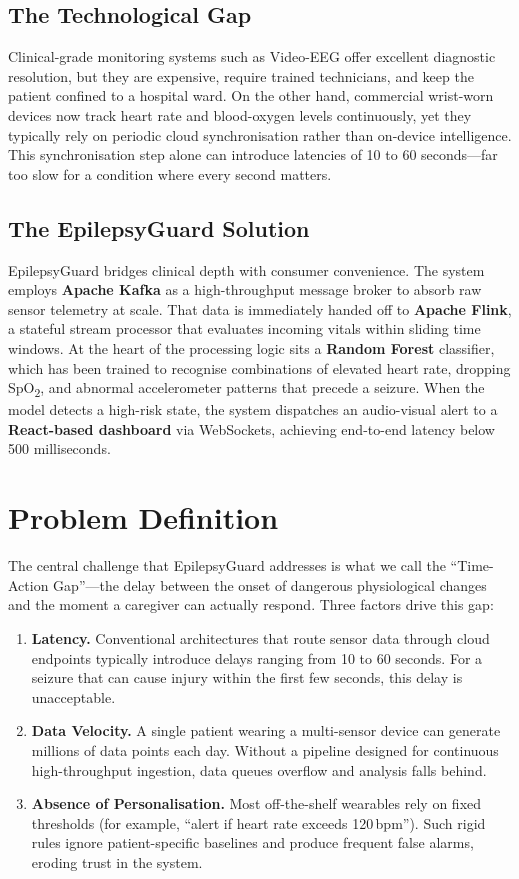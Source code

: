 \documentclass[12pt, a4paper, oneside]{report}
\begin{document}
\subsection{The Technological Gap}
Clinical-grade monitoring systems such as Video-EEG offer excellent diagnostic resolution, but they are expensive, require trained technicians, and keep the patient confined to a hospital ward. On the other hand, commercial wrist-worn devices now track heart rate and blood-oxygen levels continuously, yet they typically rely on periodic cloud synchronisation rather than on-device intelligence. This synchronisation step alone can introduce latencies of 10 to 60 seconds---far too slow for a condition where every second matters.

\subsection{The EpilepsyGuard Solution}
EpilepsyGuard bridges clinical depth with consumer convenience. The system employs \textbf{Apache Kafka} as a high-throughput message broker to absorb raw sensor telemetry at scale. That data is immediately handed off to \textbf{Apache Flink}, a stateful stream processor that evaluates incoming vitals within sliding time windows. At the heart of the processing logic sits a \textbf{Random Forest} classifier, which has been trained to recognise combinations of elevated heart rate, dropping SpO\textsubscript{2}, and abnormal accelerometer patterns that precede a seizure. When the model detects a high-risk state, the system dispatches an audio-visual alert to a \textbf{React-based dashboard} via WebSockets, achieving end-to-end latency below 500 milliseconds.

\section{Problem Definition}
The central challenge that EpilepsyGuard addresses is what we call the ``Time-Action Gap''---the delay between the onset of dangerous physiological changes and the moment a caregiver can actually respond. Three factors drive this gap:

\begin{enumerate}
    \item \textbf{Latency.} Conventional architectures that route sensor data through cloud endpoints typically introduce delays ranging from 10 to 60 seconds. For a seizure that can cause injury within the first few seconds, this delay is unacceptable.
    \item \textbf{Data Velocity.} A single patient wearing a multi-sensor device can generate millions of data points each day. Without a pipeline designed for continuous high-throughput ingestion, data queues overflow and analysis falls behind.
    \item \textbf{Absence of Personalisation.} Most off-the-shelf wearables rely on fixed thresholds (for example, ``alert if heart rate exceeds 120\,bpm''). Such rigid rules ignore patient-specific baselines and produce frequent false alarms, eroding trust in the system.
\end{enumerate}
\end{document}
